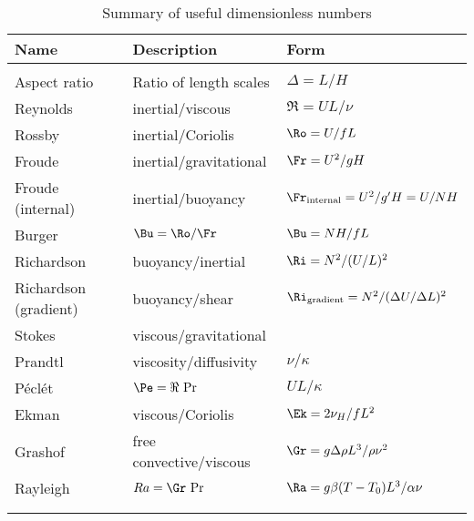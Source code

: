 \begin{table}[t]
\begin{center}
\begin{tabular}{lll} \hline
Name        &   Description         &   Form        \\  \hline
            &                           &               \\
Aspect ratio   &   Ratio of length scales   &   $\Delta=L/H$  \\
Reynolds    &   inertial/viscous        &   $\Re=UL/\nu$    \\
Rossby      &   inertial/Coriolis\footnotemark[6]            &   $\Ro=U/fL$      \\
Froude      &   inertial/gravitational\footnotemark[7] &   $\Fr=U^2/gH$    \\
Froude (internal)   &   inertial/buoyancy   &   $\Fr_{\mathrm{internal}}=U^2/g'H=U/NH$   \\
Burger      &  $\Bu=\Ro/\Fr$    &   $\Bu = NH/fL$  \\
Richardson  &   buoyancy/inertial\footnotemark[8]       &   $\Ri=N^2/(U/L)^2$   \\
Richardson (gradient)   &   buoyancy/shear  &   $\Ri_{\mathrm{gradient}}=N^2/(\Delta U/\Delta L)^2$ \\
Stokes      &   viscous/gravitational   &   \\
Prandtl     &   viscosity/diffusivity   &  $\nu/\kappa$ \\
P\'ecl\'et  &     $\Pe=\Re\,\Pr$  &  $UL/\kappa$ \\
Ekman       &   viscous/Coriolis    &   $\Ek=2\nu_H/fL^2$   \\
Grashof     &    free convective/viscous    & $\Gr=g\Delta\rho L^3/\rho \nu^2$\\
Rayleigh    &     $Ra=\Gr\,\Pr$                 & $\Ra = g\beta(T-T_0)L^3/\alpha\nu$\\
            &                           &               \\  \hline
\label{table:dimensionless}
\end{tabular}
\end{center}

\caption{Summary of useful dimensionless numbers}
\label{tab:dimensionless}
\end{table}


